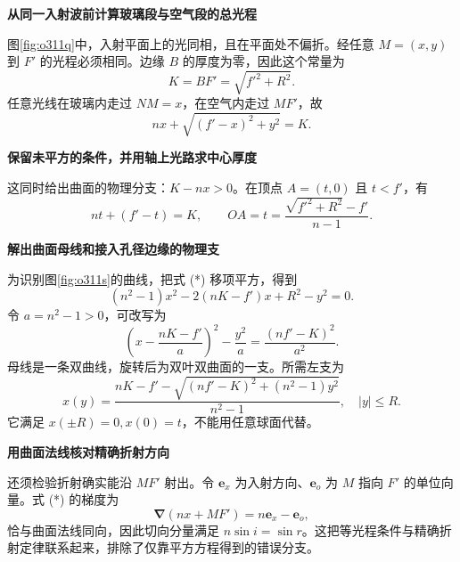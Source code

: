 \begin{solution}\textbf{从同一入射波前计算玻璃段与空气段的总光程}\par\nobreak
图\ref{fig:o311q}中，入射平面上的光同相，且在平面处不偏折。经任意 \(M=(x,y)\) 到 \(F'\) 的光程必须相同。边缘 \(B\) 的厚度为零，因此这个常量为
\[
 K=BF'=\sqrt{f'^2+R^2}.
\]
任意光线在玻璃内走过 \(NM=x\)，在空气内走过 \(MF'\)，故
\[
 \boxed{nx+\sqrt{(f'-x)^2+y^2}=K}. \tag{*}
\]


\par\medskip{}\noindent\textbf{保留未平方的条件，并用轴上光路求中心厚度}\par\nobreak
这同时给出曲面的物理分支：\(K-nx>0\)。在顶点 \(A=(t,0)\) 且 \(t<f'\)，有
\[
 nt+(f'-t)=K,\qquad
 \boxed{OA=t=\frac{\sqrt{f'^2+R^2}-f'}{n-1}}.
\]



\par\medskip{}\noindent\textbf{解出曲面母线和接入孔径边缘的物理支}\par\nobreak
为识别图\ref{fig:o311s}的曲线，把式 (*) 移项平方，得到
\[
 (n^2-1)x^2-2(nK-f')x+R^2-y^2=0.
\]
令 \(a=n^2-1>0\)，可改写为
\[
 \left(x-\frac{nK-f'}a\right)^2-\frac{y^2}a
 =\frac{(nf'-K)^2}{a^2}.
\]
母线是一条双曲线，旋转后为双叶双曲面的一支。所需左支为
\[
 \boxed{x(y)=\frac{nK-f'-\sqrt{(nf'-K)^2+(n^2-1)y^2}}{n^2-1}},
 \quad |y|\le R.
\]
它满足 \(x(\pm R)=0,x(0)=t\)，不能用任意球面代替。



\par\medskip{}\noindent\textbf{用曲面法线核对精确折射方向}\par\nobreak
还须检验折射确实能沿 \(MF'\) 射出。令 \(\boldsymbol e_x\) 为入射方向、\(\boldsymbol e_o\) 为 \(M\) 指向 \(F'\) 的单位向量。式 (*) 的梯度为
\[
 \boldsymbol\nabla(nx+MF')=n\boldsymbol e_x-\boldsymbol e_o,
\]
恰与曲面法线同向，因此切向分量满足 \(n\sin i=\sin r\)。这把等光程条件与精确折射定律联系起来，排除了仅靠平方方程得到的错误分支。




\end{solution}

